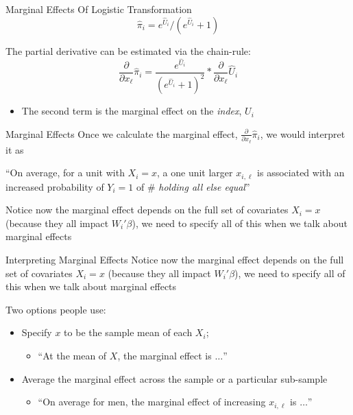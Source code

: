 \documentclass[aspectratio=169,t,11pt,table]{beamer}
\begin{document}

\begin{frame}{Marginal Effects Of Logistic Transformation}
  \vspace*{-\bigskipamount}
  $$
    \hat{\pi}_i = e^{\hat{U}_i} / ( e^{\hat{U}_i} + 1 )
  $$
  
  \bigskip
  The partial derivative can be estimated via the chain-rule:
  $$
    \frac{\partial}{\partial x_{\ell}} \hat{\pi}_i =
    \frac{e^{\hat{U}_i}}{(e^{\hat{U}_i} + 1)^2} * 
    \frac{\partial}{\partial x_{\ell}} \hat{U}_i
  $$

  \begin{itemize}
    \item The second term is the marginal effect on the \emph{index}, $U_i$
  \end{itemize}
\end{frame}

\begin{frame}{Marginal Effects}
  Once we calculate the marginal effect, $\frac{\partial}{\partial x_{\ell}} \hat{\pi}_i$, we would interpret it as 

  \begin{tcolorbox}[boxrule = 0pt, frame hidden, sharp corners, enhanced, borderline west = {2pt}{0pt}{zinc600}, interior hidden]
    ``On average, for a unit with $X_i = x$, a one unit larger $x_{i, \ell}$ is associated with an increased probability of $Y_i = 1$ of \# \emph{\color{blue} holding all else equal}''
  \end{tcolorbox}

  \pause
  \bigskip
  Notice now the marginal effect depends on the full set of covariates $X_i = x$ (because they all impact $W_i' \beta$), we need to specify all of this when we talk about marginal effects
\end{frame}

\begin{frame}{Interpreting Marginal Effects}
  Notice now the marginal effect depends on the full set of covariates $X_i = x$ (because they all impact $W_i' \beta$), we need to specify all of this when we talk about marginal effects

  \bigskip
  Two options people use:
  \begin{itemize}
    \item Specify $x$ to be the sample mean of each $X_i$; 
    \begin{itemize}
      \item ``At the mean of $X$, the marginal effect is $\dots$''
    \end{itemize}

    \medskip
    \item Average the marginal effect across the sample or a particular sub-sample
    \begin{itemize}
      \item ``On average for men, the marginal effect of increasing $x_{i,\ell}$ is $\dots$''
    \end{itemize}
  \end{itemize}
\end{frame}
\end{document}
